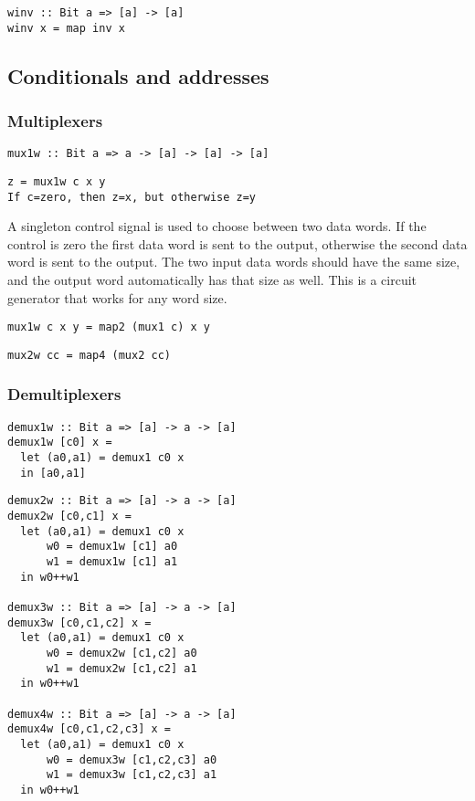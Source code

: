\documentclass[11pt]{article}
\begin{document}
\begin{verbatim}
winv :: Bit a => [a] -> [a]
winv x = map inv x
\end{verbatim}

\subsection{Conditionals and addresses}
\label{sec:org9fa0a54}

\subsubsection{Multiplexers}
\label{sec:org388edbc}


\begin{verbatim}
mux1w :: Bit a => a -> [a] -> [a] -> [a]
\end{verbatim}



\begin{verbatim}
z = mux1w c x y
If c=zero, then z=x, but otherwise z=y
\end{verbatim}


A singleton control signal is used to choose between two data words.
If the control is zero the first data word is sent to the output,
otherwise the second data word is sent to the output.  The two input
data words should have the same size, and the output word
automatically has that size as well.  This is a circuit generator that
works for any word size.



\begin{verbatim}
mux1w c x y = map2 (mux1 c) x y
\end{verbatim}



\begin{verbatim}
mux2w cc = map4 (mux2 cc)
\end{verbatim}


\subsubsection{Demultiplexers}
\label{sec:orgfd8d79e}



\begin{verbatim}
demux1w :: Bit a => [a] -> a -> [a]
demux1w [c0] x =
  let (a0,a1) = demux1 c0 x
  in [a0,a1]
\end{verbatim}



\begin{verbatim}
demux2w :: Bit a => [a] -> a -> [a]
demux2w [c0,c1] x =
  let (a0,a1) = demux1 c0 x
      w0 = demux1w [c1] a0
      w1 = demux1w [c1] a1
  in w0++w1

demux3w :: Bit a => [a] -> a -> [a]
demux3w [c0,c1,c2] x =
  let (a0,a1) = demux1 c0 x
      w0 = demux2w [c1,c2] a0
      w1 = demux2w [c1,c2] a1
  in w0++w1

demux4w :: Bit a => [a] -> a -> [a]
demux4w [c0,c1,c2,c3] x =
  let (a0,a1) = demux1 c0 x
      w0 = demux3w [c1,c2,c3] a0
      w1 = demux3w [c1,c2,c3] a1
  in w0++w1
\end{verbatim}
\end{document}
